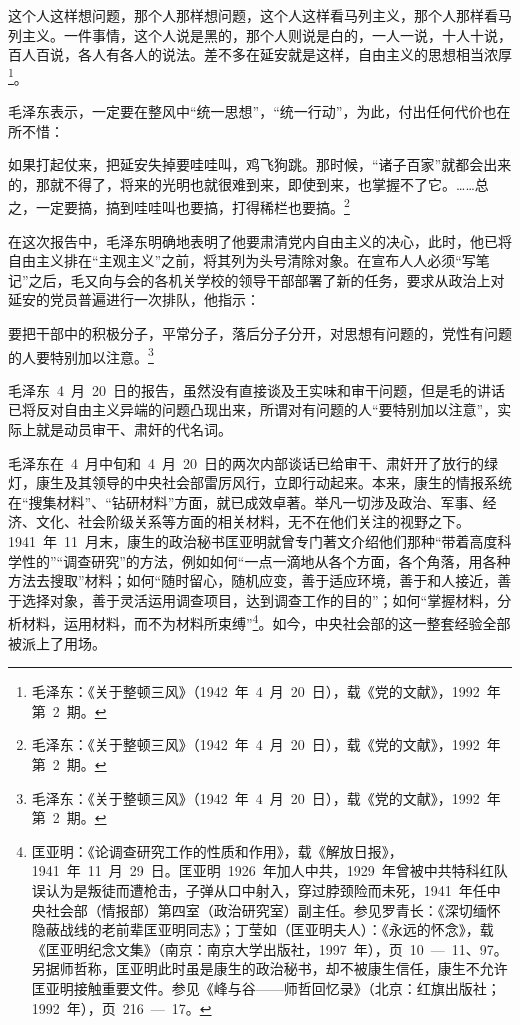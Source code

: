 \begin{quoting}
这个人这样想问题，那个人那样想问题，这个人这样看马列主义，那个人那样看马列主义。一件事情，这个人说是黑的，那个人则说是白的，一人一说，十人十说，百人百说，各人有各人的说法。差不多在延安就是这样，自由主义的思想相当浓厚\footnote{毛泽东：《关于整顿三风》（1942~年~4~月~20~日），载《党的文献》，1992~年第~2~期。}。
\end{quoting}

毛泽东表示，一定要在整风中“统一思想”，“统一行动”，为此，付出任何代价也在所不惜：

\begin{quoting}
如果打起仗来，把延安失掉要哇哇叫，鸡飞狗跳。那时候，“诸子百家”就都会出来的，那就不得了，将来的光明也就很难到来，即使到来，也掌握不了它。……总之，一定要搞，搞到哇哇叫也要搞，打得稀栏也要搞。\footnote{毛泽东：《关于整顿三风》（1942~年~4~月~20~日），载《党的文献》，1992~年第~2~期。}
\end{quoting}

在这次报告中，毛泽东明确地表明了他要肃清党内自由主义的决心，此时，他已将自由主义排在“主观主义”之前，将其列为头号清除对象。在宣布人人必须“写笔记”之后，毛又向与会的各机关学校的领导干部部署了新的任务，要求从政治上对延安的党员普遍进行一次排队，他指示：

\begin{quoting}
要把干部中的积极分子，平常分子，落后分子分开，对思想有问题的，党性有问题的人要特别加以注意。\footnote{毛泽东：《关于整顿三风》（1942~年~4~月~20~日），载《党的文献》，1992~年第~2~期。}
\end{quoting}

毛泽东~4~月~20~日的报告，虽然没有直接谈及王实味和审干问题，但是毛的讲话已将反对自由主义异端的问题凸现出来，所谓对有问题的人“要特别加以注意”，实际上就是动员审干、肃奸的代名词。

毛泽东在~4~月中旬和~4~月~20~日的两次内部谈话已给审干、肃奸开了放行的绿灯，康生及其领导的中央社会部雷厉风行，立即行动起来。本来，康生的情报系统在“搜集材料”、“钻研材料”方面，就已成效卓著。举凡一切涉及政治、军事、经济、文化、社会阶级关系等方面的相关材料，无不在他们关注的视野之下。1941~年~11~月末，康生的政治秘书匡亚明就曾专门著文介绍他们那种“带着高度科学性的”“调查研究”的方法，例如如何“一点一滴地从各个方面，各个角落，用各种方法去搜取”材料；如何“随时留心，随机应变，善于适应环境，善于和人接近，善于选择对象，善于灵活运用调查项目，达到调查工作的目的”；如何“掌握材料，分析材料，运用材料，而不为材料所束缚”\footnote{匡亚明：《论调查研究工作的性质和作用》，载《解放日报》，1941~年~11~月~29~日。匡亚明~1926~年加人中共，1929~年曾被中共特科红队误认为是叛徒而遭枪击，子弹从口中射入，穿过脖颈险而未死，1941~年任中央社会部（情报部）第四室（政治研究室）副主任。参见罗青长：《深切缅怀隐蔽战线的老前辈匡亚明同志》；丁莹如（匡亚明夫人）：《永远的怀念》，载《匡亚明纪念文集》（南京：南京大学出版社，1997~年），页~10~—~11、97。另据师哲称，匡亚明此时虽是康生的政治秘书，却不被康生信任，康生不允许匡亚明接触重要文件。参见《峰与谷——师哲回忆录》（北京：红旗出版社；1992~年），页~216~—~17。}。如今，中央社会部的这一整套经验全部被派上了用场。

